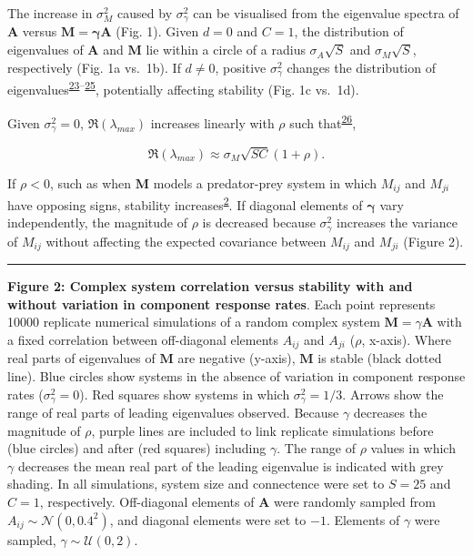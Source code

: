 \documentclass[]{article}
\begin{document}
The increase in \(\sigma^{2}_{M}\) caused by \(\sigma^{2}_\gamma\) can
be visualised from the eigenvalue spectra of \(\textbf{A}\) versus
\(\textbf{M} = \boldsymbol{\gamma}\textbf{A}\) (Fig. 1). Given \(d = 0\)
and \(C = 1\), the distribution of eigenvalues of \(\textbf{A}\) and
\(\textbf{M}\) lie within a circle of a radius \(\sigma_{A}\sqrt{S}\)
and \(\sigma_{M}\sqrt{S}\), respectively (Fig. 1a vs.~1b). If
\(d \neq 0\), positive \(\sigma^{2}_\gamma\) changes the distribution of
eigenvalues\textsuperscript{\protect\hyperlink{ref-Ahmadian2015}{23}--\protect\hyperlink{ref-Stone2017}{25}},
potentially affecting stability (Fig. 1c vs.~1d).

Given \(\sigma^{2}_\gamma = 0\), \(\Re(\lambda_{max})\) increases
linearly with \(\rho\) such
that\textsuperscript{\protect\hyperlink{ref-Tang2014c}{26}},

\begin{equation} \label{rho_stab}
\Re(\lambda_{max}) \approx \sigma_{M}\sqrt{SC}\left(1 + \rho\right).
\end{equation}

If \(\rho < 0\), such as when \(\textbf{M}\) models a predator-prey
system in which \(M_{ij}\) and \(M_{ji}\) have opposing signs, stability
increases\textsuperscript{\protect\hyperlink{ref-Allesina2012}{2}}. If
diagonal elements of \(\boldsymbol{\gamma}\) vary independently, the
magnitude of \(\rho\) is decreased because \(\sigma^{2}_{\gamma}\)
increases the variance of \(M_{ij}\) without affecting the expected
covariance between \(M_{ij}\) and \(M_{ji}\) (Figure 2).

\vspace{2mm}
\hrule
\vspace{2mm}

\textbf{Figure 2: Complex system correlation versus stability with and
without variation in component response rates}. Each point represents
10000 replicate numerical simulations of a random complex system
\(\mathbf{M} = \gamma \mathbf{A}\) with a fixed correlation between
off-diagonal elements \(A_{ij}\) and \(A_{ji}\) (\(\rho\), x-axis).
Where real parts of eigenvalues of \(\mathbf{M}\) are negative (y-axis),
\(\mathbf{M}\) is stable (black dotted line). Blue circles show systems
in the absence of variation in component response rates
(\(\sigma^{2}_{\gamma} = 0\)). Red squares show systems in which
\(\sigma^{2}_{\gamma} = 1/3\). Arrows show the range of real parts of
leading eigenvalues observed. Because \(\gamma\) decreases the magnitude
of \(\rho\), purple lines are included to link replicate simulations
before (blue circles) and after (red squares) including \(\gamma\). The
range of \(\rho\) values in which \(\gamma\) decreases the mean real
part of the leading eigenvalue is indicated with grey shading. In all
simulations, system size and connectence were set to \(S = 25\) and
\(C = 1\), respectively. Off-diagonal elements of \(\textbf{A}\) were
randomly sampled from \(A_{ij} \sim \mathcal{N}(0, 0.4^{2})\), and
diagonal elements were set to \(-1\). Elements of \(\gamma\) were
sampled, \(\gamma \sim \mathcal{U}(0, 2)\).
\end{document}
